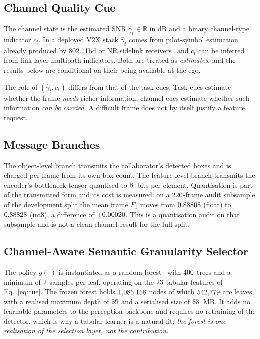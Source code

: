 \documentclass[journal]{IEEEtran}
\begin{document}
\subsection{Channel Quality Cue}
The channel state is the estimated SNR $\hat\gamma_t \in \mathbb{R}$ in dB and a binary channel-type
indicator $c_t$. In a deployed V2X stack $\hat\gamma_t$ comes from pilot-symbol estimation already
produced by 802.11bd or NR sidelink receivers~\cite{ieee80211bd} and $c_t$ can be inferred from
link-layer multipath indicators. Both are treated as \emph{estimates}, and the results below are
conditional on their being available at the ego.

The role of $(\hat\gamma_t, c_t)$ differs from that of the task cues. Task cues estimate whether the
frame \emph{needs} richer information; channel cues estimate whether such information \emph{can be
carried}. A difficult frame does not by itself justify a feature request.

\subsection{Message Branches}
The object-level branch transmits the collaborator's detected boxes and is charged per frame from its
own box count. The feature-level branch transmits the encoder's bottleneck tensor quantised to
$8$~bits per element. Quantisation is part of the transmitted form and its cost is
measured: on a $220$-frame audit subsample of the development split the mean
frame $F_1$ moves from $0.88808$ (float) to $0.88828$ (int8), a difference of
$+0.00020$. This is a quantisation audit on that subsample and is not a clean-channel
result for the full split.

\subsection{Channel-Aware Semantic Granularity Selector}\label{sec:selector}
The policy $g(\cdot)$ is instantiated as a random forest~\cite{breiman2001random} with
$400$ trees and a minimum of $2$ samples per leaf, operating on the
$23$ tabular features of Eq.~\eqref{eq:cue}. The frozen forest holds $1{,}085{,}158$ nodes
of which $542{,}779$ are leaves, with a realised maximum depth of $39$ and a
serialised size of $83$~MB. It adds no learnable parameters to the perception backbone and requires no retraining of the
detector, which is why a tabular learner is a natural fit; \emph{the forest is one realisation of the
selection layer, not the contribution.}
\end{document}
